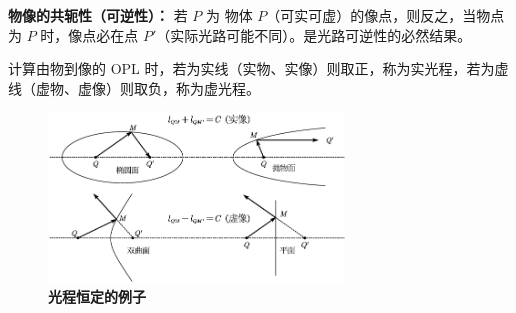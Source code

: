 \documentclass[UTF8]{report}
\theoremstyle{MyLineTheoremStyle} %
\theoremstyle{MyBlockTheoremStyle} %
\theoremstyle{MySubsubsectionStyle} %
\begin{document}
\textbf{物像的共轭性（可逆性）：}
若 $P$ 为 物体 $P$（可实可虚）的像点，则反之，当物点为 $P$ 时，像点必在点 $P'$（实际光路可能不同）。是光路可逆性的必然结果。 

计算由物到像的 OPL 时，若为实线（实物、实像）则取正，称为实光程，若为虚线（虚物、虚像）则取负，称为虚光程。

\begin{figure}[H]\centering
\includegraphics[width=0.7\textwidth]{assets/1,2/path2.pdf}
\caption{\textbf{光程恒定的例子}}\label{光程恒定的例子}
\end{figure}
\end{document}
